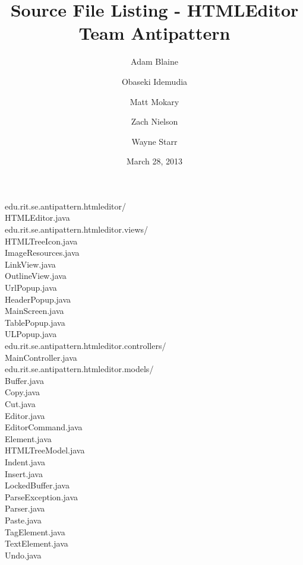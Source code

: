\documentclass[a4paper,12pt]{article}
\title{
    Source File Listing - HTMLEditor\\
    Team Antipattern
}
\author{
    Adam Blaine
    \and
    Obaseki Idemudia
    \and
    Matt Mokary
    \and
    Zach Nielson
    \and
    Wayne Starr
}
\date{March 28, 2013}
\newcommand{\tab}{\hspace*{3em}}
\begin{document}
\maketitle

\fontsize{14}{14}
\ttfamily

edu.rit.se.antipattern.htmleditor/\\
\tab HTMLEditor.java\\
edu.rit.se.antipattern.htmleditor.views/\\
\tab HTMLTreeIcon.java\\
\tab ImageResources.java\\
\tab LinkView.java\\
\tab OutlineView.java\\
\tab UrlPopup.java\\
\tab HeaderPopup.java\\
\tab MainScreen.java\\
\tab TablePopup.java\\
\tab ULPopup.java\\
edu.rit.se.antipattern.htmleditor.controllers/\\
\tab MainController.java\\
edu.rit.se.antipattern.htmleditor.models/\\
\tab Buffer.java\\
\tab Copy.java\\
\tab Cut.java\\
\tab Editor.java\\
\tab EditorCommand.java\\
\tab Element.java\\
\tab HTMLTreeModel.java\\
\tab Indent.java\\
\tab Insert.java\\
\tab LockedBuffer.java\\
\tab ParseException.java\\
\tab Parser.java\\
\tab Paste.java\\
\tab TagElement.java\\
\tab TextElement.java\\
\tab Undo.java\\
\end{document}
